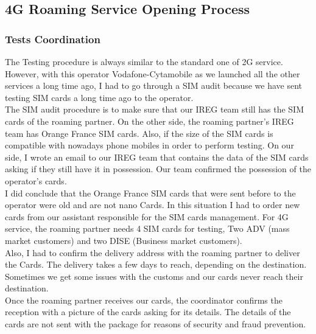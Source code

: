 \subsection{\acs{4G} Roaming Service Opening Process}

\subsubsection{Tests Coordination}
\-\hspace{0.5cm} The Testing procedure is always similar to the standard one of \acs{2G} service. However, with this operator Vodafone-Cytamobile as we launched all the other services a long time ago, I had to go through a \acs{SIM} audit because we have sent testing \acs{SIM} cards a long time ago to the operator.\\

The \acs{SIM} audit procedure is to make sure that our \acs{IREG} team still has the \acs{SIM} cards of the roaming partner. On the other side, the roaming partner’s \acs{IREG} team has Orange France \acs{SIM} cards. Also, if the size of the \acs{SIM} cards is compatible with nowadays phone mobiles in order to perform testing.
On our side, I wrote an email to our \acs{IREG} team that contains the data of the \acs{SIM} cards asking if they still have it in possession. Our team confirmed the possession of the operator’s cards.\\

I did conclude that the Orange France \acs{SIM} cards that were sent before to the operator were old and are not nano Cards. In this situation I had to order new cards from our assistant responsible for the \acs{SIM} cards management. For \acs{4G} service, the roaming partner needs 4 \acs{SIM} cards for testing, Two \acs{ADV} (mass market customers) and two \acs{DISE} (Business market customers).\\

Also, I had to confirm the delivery address with the roaming partner to deliver the Cards. The delivery takes a few days to reach, depending on the destination. Sometimes we get some issues with the customs and our cards never reach their destination.\\

Once the roaming partner receives our cards, the coordinator confirms the reception with a picture of the cards asking for its details. The details of the cards are not sent with the package for reasons of security and fraud prevention.\\

